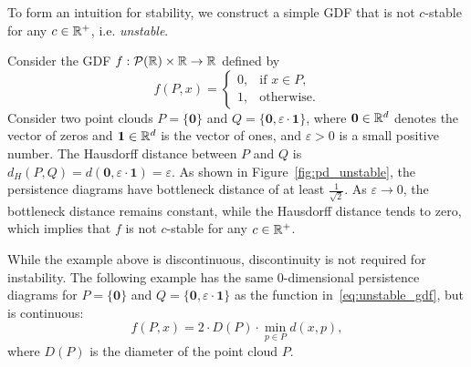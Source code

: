 To form an intuition for stability, we construct a simple GDF that is not $c$-stable
for any $c\in \mathbb{R}^+$, i.e. \emph{unstable}.
\begin{example}
    Consider the GDF $f : \mathcal{P}(\mathbb{R}) \times \mathbb{R} \to \mathbb{R}$ defined by
    \begin{equation}
        \label{eq:unstable_gdf}
        f(P, x) = \begin{cases}
           0, & \text{if } x \in P, \\
           1, & \text{otherwise.} 
        \end{cases}
    \end{equation}
    Consider two point clouds $P = \{\mathbf{0}\}$ and
    $Q = \{\mathbf{0}, \varepsilon \cdot \mathbf{1}\}$, where $\mathbf{0}\in
    \mathbb{R}^d$ denotes the vector of zeros and $\mathbf{1} \in \mathbb{R}^d$ is the vector of
    ones, and $\varepsilon > 0$ is a small positive number. The Hausdorff
    distance between $P$ and $Q$ is $d_H(P, Q) = d(\mathbf{0}, \varepsilon \cdot
    \mathbf{1}) = \varepsilon$. As shown in Figure~\ref{fig:pd_unstable}, the
    persistence diagrams have bottleneck distance of at least
    $\frac{1}{\sqrt{2}}$. As $\varepsilon \to 0$, the bottleneck distance
    remains constant, while the Hausdorff distance tends to zero, which implies
    that $f$ is not $c$-stable for any $c \in \mathbb{R}^+$.
\end{example}
While the example above is discontinuous, discontinuity is not required for
instability. The following example has the same 0-dimensional persistence
diagrams for $P = \{\mathbf{0}\}$ and $Q = \{\mathbf{0}, \varepsilon \cdot \mathbf{1}\}$
as the function in~\eqref{eq:unstable_gdf}, but is continuous:
\begin{equation}
   f(P, x) = 2 \cdot D(P) \cdot \min_{p\in P} d(x, p),
\end{equation}
where $D(P)$ is the diameter of the point cloud $P$.
